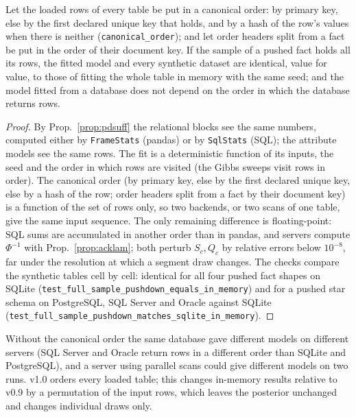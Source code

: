 \begin{proposition}\label{prop:pdexact}
Let the loaded rows of every table be put in a canonical order: by primary key, else by the first declared unique key that holds, and by a hash of the row's values when there is neither (\texttt{canonical\_order}); and let order headers split from a fact be put in the order of their document key. If the sample of a pushed fact holds all its rows, the fitted model and every synthetic dataset are identical, value for value, to those of fitting the whole table in memory with the same seed; and the model fitted from a database does not depend on the order in which the database returns rows.
\end{proposition}
\begin{proof}
By Prop.~\ref{prop:pdsuff} the relational blocks see the same numbers, computed either by \texttt{FrameStats} (pandas) or by \texttt{SqlStats} (SQL); the attribute models see the same rows. The fit is a deterministic function of its inputs, the seed and the order in which rows are visited (the Gibbs sweeps visit rows in order). The canonical order (by primary key, else by the first declared unique key, else by a hash of the row; order headers split from a fact by their document key) is a function of the set of rows only, so two backends, or two scans of one table, give the same input sequence. The only remaining difference is floating-point: SQL sums are accumulated in another order than in pandas, and servers compute $\Phi^{-1}$ with Prop.~\ref{prop:acklam}; both perturb $S_c,Q_c$ by relative errors below $10^{-8}$, far under the resolution at which a segment draw changes. The checks compare the synthetic tables cell by cell: identical for all four pushed fact shapes on SQLite (\texttt{test\_full\_sample\_pushdown\_equals\_in\_memory}) and for a pushed star schema on PostgreSQL, SQL Server and Oracle against SQLite (\texttt{test\_full\_sample\_pushdown\_matches\_sqlite\_in\_memory}).
\end{proof}
\noindent Without the canonical order the same database gave different models on different servers (SQL Server and Oracle return rows in a different order than SQLite and PostgreSQL), and a server using parallel scans could give different models on two runs. v1.0 orders every loaded table; this changes in-memory results relative to v0.9 by a permutation of the input rows, which leaves the posterior unchanged and changes individual draws only.

